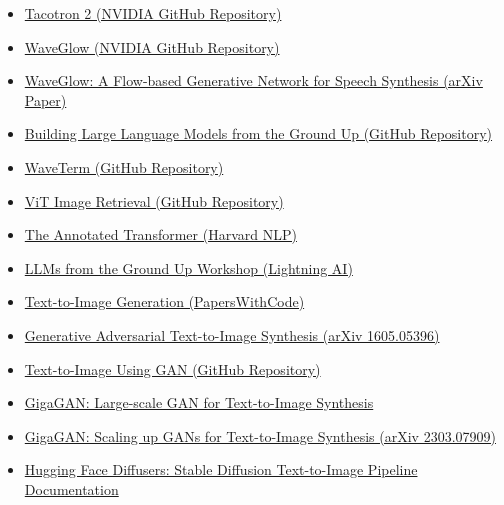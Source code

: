 \documentclass{article}
\begin{document}
\begin{itemize}
    \item \href{https://github.com/NVIDIA/tacotron2?tab=readme-ov-file}{Tacotron 2 (NVIDIA GitHub Repository)}
    \item \href{https://github.com/NVIDIA/waveglow}{WaveGlow (NVIDIA GitHub Repository)}
    \item \href{https://arxiv.org/abs/1811.00002}{WaveGlow: A Flow-based Generative Network for Speech Synthesis (arXiv Paper)}
    \item \href{https://github.com/Maitreyee1/Building-LLM-Ground-Up/tree/main}{Building Large Language Models from the Ground Up (GitHub Repository)}
    \item \href{https://github.com/wavetermdev/waveterm}{WaveTerm (GitHub Repository)}
    \item \href{https://github.com/bnsreenu/vit-image-retrieval}{ViT Image Retrieval (GitHub Repository)}
    \item \href{https://nlp.seas.harvard.edu/annotated-transformer/}{The Annotated Transformer (Harvard NLP)}
    \item \href{https://lightning.ai/lightning-ai/studios/llms-from-the-ground-up-workshop?section=featured}{LLMs from the Ground Up Workshop (Lightning AI)}
    \item \href{https://paperswithcode.com/task/text-to-image-generation}{Text-to-Image Generation (PapersWithCode)}
    \item \href{https://arxiv.org/pdf/1605.05396}{Generative Adversarial Text-to-Image Synthesis (arXiv 1605.05396)}
    \item \href{https://github.com/bunny98/Text-to-Image-Using-GAN}{Text-to-Image Using GAN (GitHub Repository)}
    \item \href{https://mingukkang.github.io/GigaGAN/}{GigaGAN: Large-scale GAN for Text-to-Image Synthesis}
    \item \href{https://arxiv.org/abs/2303.07909}{GigaGAN: Scaling up GANs for Text-to-Image Synthesis (arXiv 2303.07909)}
    \item \href{https://huggingface.co/docs/diffusers/api/pipelines/stable_diffusion/text2img}{Hugging Face Diffusers: Stable Diffusion Text-to-Image Pipeline Documentation}

\end{itemize}
\end{document}
